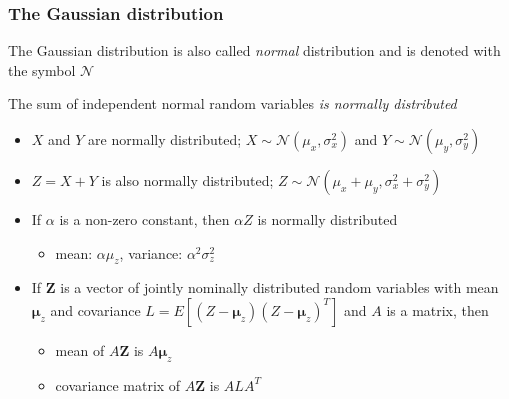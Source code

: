 \begin{frame}
	\frametitle{The Gaussian distribution}
	The Gaussian distribution is also called \emph{normal} distribution and is denoted with the symbol $\mathcal{N}$\vspace{0.5em}
	
	The sum of independent normal random variables \emph{is normally distributed}
	\begin{itemize}
		\item $X$ and $Y$ are normally distributed; $X\sim\mathcal{N}(\mu_x, \sigma_x^2)$ and $Y\sim\mathcal{N}(\mu_y, \sigma_y^2)$
		\item $Z=X+Y$ is also normally distributed; $Z\sim\mathcal{N}(\mu_x+\mu_y, \sigma_x^2+\sigma_y^2)$
		\item <3-> If $\alpha$ is a non-zero constant, then $\alpha Z$ is normally distributed
		\begin{itemize}
			\item mean: $\alpha \mu_z$, variance: $\alpha^2\sigma_z^2$
		\end{itemize}
	
		\item <4-> If $\bm{Z}$ is a vector of jointly nominally distributed random variables with mean $\bm{\mu}_z$ and covariance $L=E[(Z-\bm{\mu}_z)(Z-\bm{\mu}_z)^T]$
		and $A$ is a matrix, then
		\begin{itemize}
			\item mean of $A\bm{Z}$ is $A \bm{\mu}_z$
			\item covariance matrix of $A\bm{Z}$ is $ALA^T$
		\end{itemize}
	\end{itemize} 
\end{frame}
